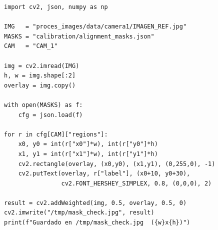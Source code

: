 \begin{codebox}
\begin{verbatim}
import cv2, json, numpy as np

IMG   = "proces_images/data/camera1/IMAGEN_REF.jpg"
MASKS = "calibration/alignment_masks.json"
CAM   = "CAM_1"

img = cv2.imread(IMG)
h, w = img.shape[:2]
overlay = img.copy()

with open(MASKS) as f:
    cfg = json.load(f)

for r in cfg[CAM]["regions"]:
    x0, y0 = int(r["x0"]*w), int(r["y0"]*h)
    x1, y1 = int(r["x1"]*w), int(r["y1"]*h)
    cv2.rectangle(overlay, (x0,y0), (x1,y1), (0,255,0), -1)
    cv2.putText(overlay, r["label"], (x0+10, y0+30),
                cv2.FONT_HERSHEY_SIMPLEX, 0.8, (0,0,0), 2)

result = cv2.addWeighted(img, 0.5, overlay, 0.5, 0)
cv2.imwrite("/tmp/mask_check.jpg", result)
print(f"Guardado en /tmp/mask_check.jpg  ({w}x{h})")
\end{verbatim}
\end{codebox}


